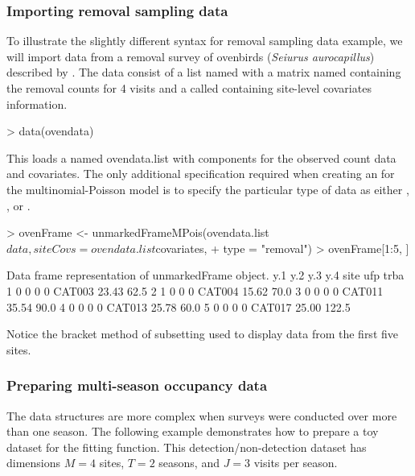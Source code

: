\documentclass[article,shortnames]{jss}
\begin{document}
{\subsubsection{Importing removal sampling data}

To illustrate the slightly different syntax for removal sampling data example,
we will import data from a removal survey of ovenbirds
({\it Seiurus aurocapillus}) described by \citet{Royle2004a}.  The data consist
of a list named  with
a matrix named  containing the removal counts for 4 visits and a
 called  containing site-level covariates
information.

\begin{Schunk}
\begin{Sinput}
> data(ovendata)
\end{Sinput}
\end{Schunk}

This loads a  named ovendata.list with components for the
observed count data and covariates.  The only additional specification
required when creating an  for the multinomial-Poisson
model is to specify the particular type of data as either
, , or .

\begin{Schunk}
\begin{Sinput}
> ovenFrame <- unmarkedFrameMPois(ovendata.list$data, siteCovs = ovendata.list$covariates, 
+     type = "removal")
> ovenFrame[1:5, ]
\end{Sinput}
\begin{Soutput}
Data frame representation of unmarkedFrame object.
  y.1 y.2 y.3 y.4   site   ufp  trba
1   0   0   0   0 CAT003 23.43  62.5
2   1   0   0   0 CAT004 15.62  70.0
3   0   0   0   0 CAT011 35.54  90.0
4   0   0   0   0 CAT013 25.78  60.0
5   0   0   0   0 CAT017 25.00 122.5
\end{Soutput}
\end{Schunk}

Notice the bracket method of subsetting used to display data from the first
five sites.

\subsubsection{Preparing multi-season occupancy data}

The data structures are more complex when surveys were conducted over more
than one season. The following example demonstrates how to prepare a toy
dataset for the  fitting function. This detection/non-detection
dataset has dimensions $M=4$ sites, $T=2$ seasons, and $J=3$ visits per season.


}
\end{document}
